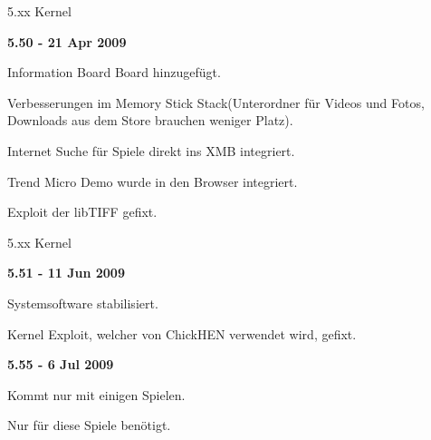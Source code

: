 \documentclass[mode=print,paper=screen,size=10pt,style=paintings]{powerdot}
\begin{document}
\begin{slide}{5.xx Kernel}
	\begin{large}\textbf{5.50 - 21 Apr 2009}\end{large}
	\begin{list}{-}{}
		\item{Information Board Board hinzugefügt.}
		\item{Verbesserungen im Memory Stick Stack(Unterordner für Videos und Fotos, Downloads aus dem Store brauchen weniger Platz).}
		\item{Internet Suche für Spiele direkt ins XMB integriert.}
		\item{Trend Micro Demo wurde in den Browser integriert.}
		\item{Exploit der libTIFF gefixt.} 
	\end{list}
\end{slide}

\begin{slide}{5.xx Kernel}
	\begin{large}\textbf{5.51 - 11 Jun 2009}\end{large}
	\begin{list}{-}{}
		\item{Systemsoftware stabilisiert.}
		\item{Kernel Exploit, welcher von ChickHEN verwendet wird, gefixt.} 
	\end{list}
	\begin{large}\textbf{5.55 - 6 Jul 2009}\end{large}
	\begin{list}{-}{}
		\item{Kommt nur mit einigen Spielen.}
		\item{Nur für diese Spiele benötigt.} 
	\end{list}
\end{slide}
\end{document}
